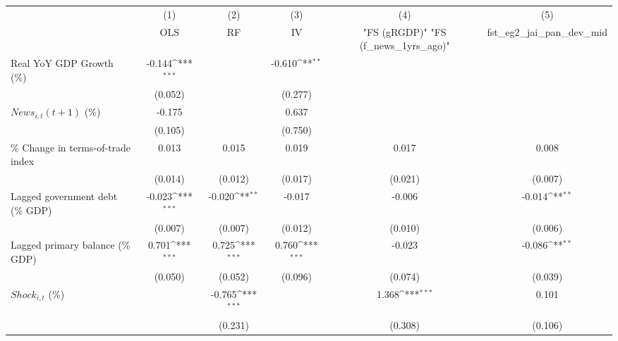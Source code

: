 {
\def\sym#1{\ifmmode^{#1}\else\(^{#1}\)\fi}
\begin{tabular}{l*{5}{c}}
\toprule
                    &\multicolumn{1}{c}{(1)}&\multicolumn{1}{c}{(2)}&\multicolumn{1}{c}{(3)}&\multicolumn{1}{c}{(4)}&\multicolumn{1}{c}{(5)}\\
                    &\multicolumn{1}{c}{OLS}&\multicolumn{1}{c}{RF}&\multicolumn{1}{c}{IV}&\multicolumn{1}{c}{ "FS (gRGDP)"  "FS (f_news_1yrs_ago)" }&\multicolumn{1}{c}{fst_eg2_jai_pan_dev_mid}\\
\midrule
Real YoY GDP Growth (\%)&      -0.144\sym{***}&                     &      -0.610\sym{**} &                     &                     \\
                    &     (0.052)         &                     &     (0.277)         &                     &                     \\
\addlinespace
$ News_{i,t}(t+1)$ (\%)&      -0.175         &                     &       0.637         &                     &                     \\
                    &     (0.105)         &                     &     (0.750)         &                     &                     \\
\addlinespace
\% Change in terms-of-trade index&       0.013         &       0.015         &       0.019         &       0.017         &       0.008         \\
                    &     (0.014)         &     (0.012)         &     (0.017)         &     (0.021)         &     (0.007)         \\
\addlinespace
Lagged government debt (\% GDP)&      -0.023\sym{***}&      -0.020\sym{**} &      -0.017         &      -0.006         &      -0.014\sym{**} \\
                    &     (0.007)         &     (0.007)         &     (0.012)         &     (0.010)         &     (0.006)         \\
\addlinespace
Lagged primary balance (\% GDP)&       0.701\sym{***}&       0.725\sym{***}&       0.760\sym{***}&      -0.023         &      -0.086\sym{**} \\
                    &     (0.050)         &     (0.052)         &     (0.096)         &     (0.074)         &     (0.039)         \\
\addlinespace
$ Shock_{i,t}$ (\%) &                     &      -0.765\sym{***}&                     &       1.368\sym{***}&       0.101         \\
                    &                     &     (0.231)         &                     &     (0.308)         &     (0.106)         \\

\end{tabular}}
